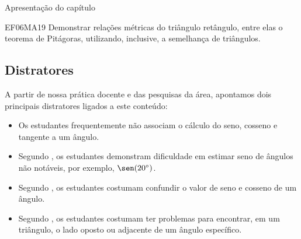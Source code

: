 \begin{apresentacao}{Apresentação do capítulo}
\begin{habilities}{EF06MA19}
 Demonstrar relações métricas do triângulo retângulo, entre elas o teorema de Pitágoras, utilizando, inclusive, a semelhança de triângulos.
\end{habilities}

\subsection*{Distratores}

A partir de nossa prática docente e das pesquisas da área, apontamos dois principais distratores ligados a este conteúdo:

\begin{itemize}
\item Os estudantes frequentemente não associam o cálculo do seno, cosseno e tangente a um ângulo. 

\item Segundo \citet{weber2005}, os estudantes demonstram dificuldade em estimar seno de ângulos não notáveis, por exemplo, $\sen(20^\circ)$.

\item Segundo \citet{feijo2018}, os estudantes costumam confundir o valor de seno e cosseno de um ângulo.

\item Segundo \citet{silvaneto2006}, os estudantes costumam ter problemas para encontrar, em um triângulo, o lado oposto ou adjacente de um ângulo específico.
\end{itemize}
\end{apresentacao}



